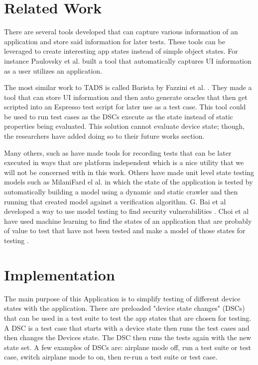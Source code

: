 \section{Related Work}
There are several tools developed that can capture various information of an application and store said information for later tests.  These tools can be leveraged to create interesting app states instead of simple object states.  For instance Paulovsky et al. \cite{7962332} built a tool that automatically captures UI information as a user utilizes an application. 

The most similar work to TADS is called Barista by Fazzini et al. \cite{7927971}.  They made a tool that can store UI information and then auto generate oracles that then get scripted into an Espresso test script for later use as a test case.  This tool could be used to run test cases as the DSCs execute as the state instead of static properties being evaluated. This solution cannot evaluate device state; though, the researchers have added doing so to their future works section.   

Many others, such as \cite{7927971} have made tools for recording tests that can be later executed in ways that are platform independent which is a nice utility that we will not be concerned with in this work.  Others have made unit level state testing models such as MilaniFard el al. \cite{MilaniFard:2014:LET:2642937.2642991} in which the state of the application is tested by automatically building a model using a dynamic and static crawler and then running that created model against a verification algorithm.  G. Bai et al developed a way to use model testing to find security vulnerabilities \cite{7911333}.  Choi et al have used machine learning to find the states of an application that are probably of value to test that have not been tested and make a model of those states for testing \cite{Choi:2013:GGT:2544173.2509552}.


\section{Implementation}
The main purpose of this Application is to simplify testing of different device states with the application.  There are preloaded "device state changes" (DSCs) that can be used in a test suite to test the app states that are chosen for testing.  A DSC is a test case that starts with a device state then runs the test cases and then changes the Devices state.  The DSC then runs the tests again with the new state set.  A few examples of DSCs are: airplane mode off, run a test suite or test case, switch airplane mode to on, then re-run a test suite or test case.

